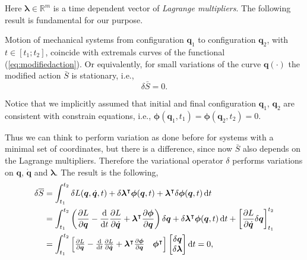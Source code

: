 		Here $\bm{\lambda}\in\mathbb{R}^{m}$ is a time dependent vector of \emph{Lagrange multipliers}.
		The following result is fundamental for our purpose.
		\begin{theorem}
			Motion of mechanical systems from configuration $\bm{q}_{1}$
			to configuration $\bm{q}_{2}$, with $t\in[t_{1}; t_{2}]$,
			coincide with extremals curves of the functional (\ref{eq:modifiedaction}).
			Or equivalently, for small variations of the curve $\bm{q}(\cdot)$
			the modified action $\bar{S}$ is stationary, i.e.,
			\begin{equation*}
				\delta\bar{S} = 0.
			\end{equation*}
		\end{theorem}
		\begin{remark}
			Notice that we implicitly assumed that initial and
			final configuration $\bm{q}_{1}$, $\bm{q}_{2}$ are
			consistent with constrain equations, i.e., $\bm{\phi}(\bm{q}_{1},t_{1})
			= \bm{\phi}(\bm{q}_{2},t_{2})= 0$.
		\end{remark}
		Thus we can think to perform variation as done before for
		systems with a minimal set of coordinates, 
		but there is a difference, since now $\bar{S}$ also depends
		on the Lagrange multipliers.
		Therefore the variational operator $\delta$ performs
		variations on $\bm{q}$, $\bm{\dot{q}}$ and $\bm{\lambda}$.
		The result is the following,
		\begin{subequations}
			\begin{align}
				\label{eq:variationmodifiedaction}
				\delta\overline{S} &= \int_{t_{1}}^{t_{2}}
				\delta L(\bm{q},\dot{\bm{q}},t)+
				\delta\bm{\lambda}^{\intercal}\bm{\phi}(\bm{q},t)+
				\bm{\lambda}^{\intercal}\delta\bm{\phi}(\bm{q},t)\mathop{}\!\mathrm{d} t\\
				&=  \int_{t_{1}}^{t_{2}}\left(\frac{\partial L}{\partial\bm{q}}
				- \frac{\mathop{}\!\mathrm{d}}{\mathop{}\!\mathrm{d} t}\frac{\partial L}{\partial\dot{\bm{q}}}
				+\bm{\lambda}^{\intercal}\frac{\partial\bm{\phi}}{\partial\bm{q}}\right)\delta\bm{q}
				+\delta\bm{\lambda}^{\intercal}\bm{\phi}(\bm{q},t)\mathop{}\!\mathrm{d} t
				+\left[\frac{\partial L}{\partial\dot{\bm{q}}}\delta\bm{q} \right]_{t_{1}}^{t_{2}}\\
				&=\int_{t_{1}}^{t_{2}}
				\begin{bmatrix}
					\frac{\partial L}{\partial\bm{q}}
					- \frac{\mathop{}\!\mathrm{d}}{\mathop{}\!\mathrm{d} t}\frac{\partial L}{\partial\dot{\bm{q}}}
					+ \bm{\lambda}^{\intercal}\frac{\partial\bm{\phi}}{\partial\bm{q}}
					& \bm{\phi}^{\intercal}
				\end{bmatrix}
				\begin{bmatrix}
					\delta\bm{q} \\
					\delta\bm{\lambda}
				\end{bmatrix} \mathop{}\!\mathrm{d} t = 0,
			\end{align}
		\end{subequations} 
